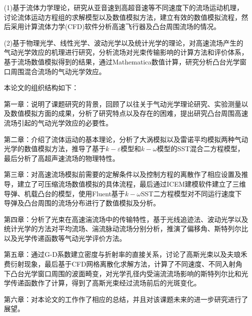 (1)基于流体力学理论，研究从亚音速到高超音速等不同速度下的流场运动机理，讨论流体运动方程组的求解模型以及数值模拟方法，建立有效的数值模拟流程，然后采用计算流体力学(CFD)软件分析高速飞行器及凸台周围流场的情况。

(2)基于物理光学、线性光学、波动光学以及统计光学的理论，对高速流场产生的气动光学效应的机理进行研究，分析流场对光束传输影响的计算方法和评价体系，基于流场数值模拟得到的结果，通过Mathematica数值计算，研究分析凸台光学窗口周围混合流场的气动光学效应。

本论文的组织结构如下：

第一章：说明了课题研究的背景，回顾了以往关于气动光学理论研究、实验测量以及数值模拟方面的成果，分析了研究特点以及存在的困难，提出研究凸台周围高速流场引起的气动光学效应的必要性。

第二章：介绍了流体运动的基本理论，分析了大涡模拟以及雷诺平均模拟两种气动光学的数值模拟方法，推导了基于$k-\varepsilon$模型和$k-\omega$模型的SST混合二方程模型，最后分析了高超声速流场的物理特性。

第三章：对高速流场模拟前需要的定解条件以及控制方程的离散作了相应设置及推导，建立了可压缩流场数值模拟的具体流程，最后通过ICEM建模软件建立了三维导弹、机载凸台的模型，使用Fluent基于$k-\omega$SST二方程模型对不同运行速度下导弹及凸台周围的流场分布进行了数值模拟及分析。

第四章：分析了光束在高速湍流场中的传输特性，基于光线追迹法、波动光学以及统计光学的方法对平均流场、湍流脉动流场分别分析，推演了偏移角、斯特列尔比以及光学传递函数等气动光学评价方法。

第五章：通过G-D系数建立密度与折射率的直接关系，讨论了高斯光束以及夫琅禾费衍射现象，最后基于CFD网格离散化求解方法，计算了不同速度、不同入射角下凸台光学窗口周围的波面畸变，对光学孔径内受湍流流场影响的斯特列尔比和光学传递函数作了计算，得到了高斯光束经过流场前后的光斑变化。
 
 第六章：对本论文的工作作了相应的总结，并且对该课题未来的进一步研究进行了展望。
 
 
 